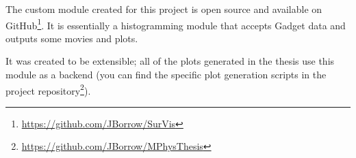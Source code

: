 The custom \sv module created for this project is open source and available on GitHub\footnote{\url{https://github.com/JBorrow/SurVis}}.
It is essentially a histogramming module that accepts Gadget data and outputs some movies and plots.

It was created to be extensible; all of the plots generated in the thesis use this module as a backend (you can find the specific plot generation scripts in the project repository\footnote{\url{https://github.com/JBorrow/MPhysThesis}}).
